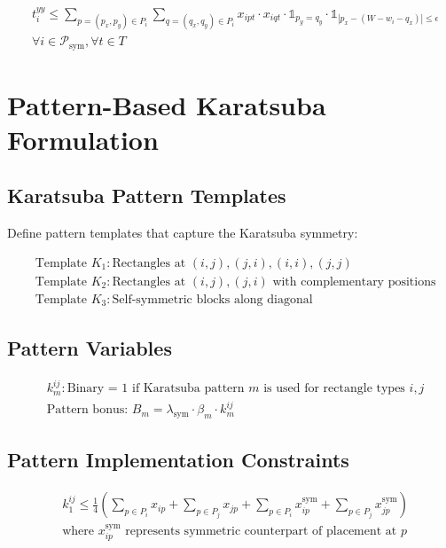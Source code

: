 \documentclass{article}
\begin{document}
\begin{align}
& t_{i}^{yy} \leq \sum_{p=(p_x,p_y) \in P_i} \sum_{q=(q_x,q_y) \in P_i} x_{ipt} \cdot x_{iqt} \cdot \mathbb{1}_{p_y = q_y} \cdot \mathbb{1}_{|p_x - (W - w_i - q_x)| \leq \epsilon} \\
& \forall i \in \mathcal{P}_{\text{sym}}, \forall t \in T
\end{align}

\section{Pattern-Based Karatsuba Formulation}

\subsection{Karatsuba Pattern Templates}
Define pattern templates that capture the Karatsuba symmetry:

\begin{align}
& \text{Template } K_1: \text{Rectangles at } (i,j), (j,i), (i,i), (j,j) \\
& \text{Template } K_2: \text{Rectangles at } (i,j), (j,i) \text{ with complementary positions} \\
& \text{Template } K_3: \text{Self-symmetric blocks along diagonal}
\end{align}

\subsection{Pattern Variables}
\begin{align}
& k_{m}^{ij}: \text{Binary = 1 if Karatsuba pattern } m \text{ is used for rectangle types } i,j \\
& \text{Pattern bonus: } B_m = \lambda_{\text{sym}} \cdot \beta_m \cdot k_{m}^{ij}
\end{align}

\subsection{Pattern Implementation Constraints}
\begin{align}
& k_{1}^{ij} \leq \frac{1}{4} \left( \sum_{p \in P_i} x_{ip} + \sum_{p \in P_j} x_{jp} + \sum_{p \in P_i} x_{ip}^{\text{sym}} + \sum_{p \in P_j} x_{jp}^{\text{sym}} \right) \\
& \text{where } x_{ip}^{\text{sym}} \text{ represents symmetric counterpart of placement at } p
\end{align}
\end{document}
